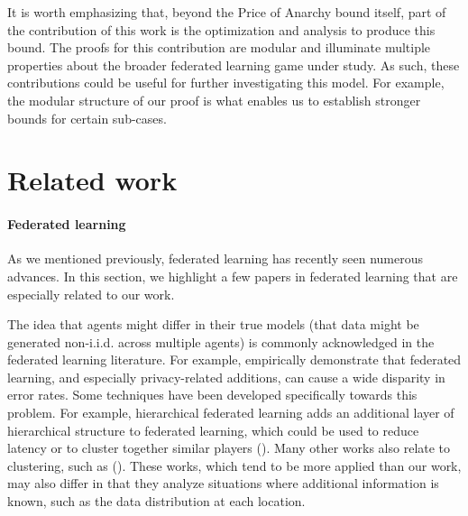 \documentclass{article}
\begin{document}
It is worth emphasizing that, beyond the Price of Anarchy bound itself, part of the contribution of this work is the optimization and analysis to produce this bound. The proofs for this contribution are modular and illuminate multiple properties about the broader federated learning game under study. As such, these contributions could be useful for further investigating this model. For example, the modular structure of our proof is what enables us to establish stronger bounds for certain sub-cases. 


\section{Related work}\label{sec:relatedwork}

\paragraph{\bf Federated learning}

As we mentioned previously, federated learning has recently seen numerous advances. In this section, we highlight a few papers in federated learning that are especially related to our work.

The idea that agents might differ in their true models (that data might be generated non-i.i.d. across multiple agents) is commonly acknowledged in the federated learning literature. For example, \cite{yu2020salvaging, bagdasaryan2019differential} empirically demonstrate that federated learning, and especially privacy-related additions, can cause a wide disparity in error rates. Some techniques have been developed specifically towards this problem.  For example, hierarchical federated learning adds an additional layer of hierarchical structure to federated learning, which could be used to reduce latency or to cluster together similar players (\cite{lin2018dont, Liu_2020}). Many other works also relate to clustering, such as (\cite{Lee2020AccurateAF, Sattler_2020, ShlezingerClustFed, wang2020split, duanfedgroup, jamali2021federated, caldarola2021cluster}). These works, which tend to be more applied than our work, may also differ in that they analyze situations where additional information is known, such as the data distribution at each location. 
\end{document}
